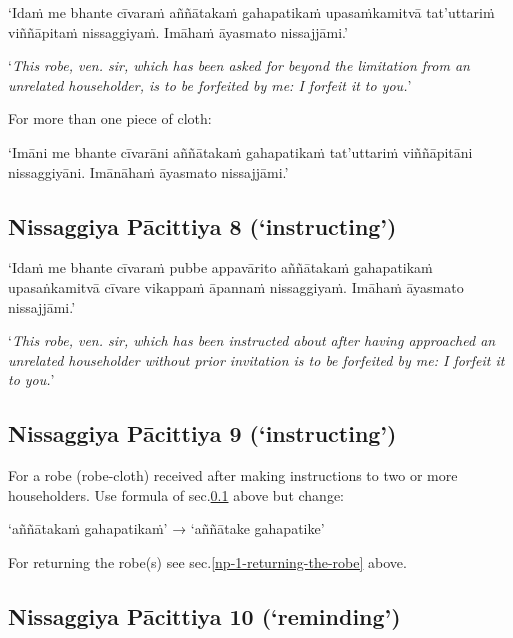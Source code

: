 ‘Idaṁ me bhante cīvaraṁ aññātakaṁ gahapatikaṁ upasaṁkamitvā tat'uttariṁ
viññāpitaṁ nissaggiyaṁ. Imāhaṁ āyasmato nissajjāmi.’

‘\emph{This robe, ven. sir, which has been asked for beyond the limitation from
  an unrelated householder, is to be forfeited by me: I forfeit it to you.}’

For more than one piece of cloth:

‘Imāni me bhante cīvarāni aññātakaṁ gahapatikaṁ tat'uttariṁ viññāpitāni
nissaggiyāni. Imānāhaṁ āyasmato nissajjāmi.’


\subsection[NP 8 (‘instructing’)]{Nissaggiya Pācittiya 8 (‘instructing’)}
\label{np-8-instructing}

‘Idaṁ me bhante cīvaraṁ pubbe appavārito aññātakaṁ gahapatikaṁ upasaṅkamitvā
cīvare vikappaṁ āpannaṁ nissaggiyaṁ. Imāhaṁ āyasmato nissajjāmi.’

‘\emph{This robe, ven. sir, which has been instructed about after having
  approached an unrelated householder without prior invitation is to be
  forfeited by me: I forfeit it to you.}’ 


\subsection[NP 9 (‘instructing’)]{Nissaggiya Pācittiya 9 (‘instructing’)}

For a robe (robe-cloth) received after making instructions to two or more
householders. Use formula of sec.\ref{np-8-instructing} above but change:

‘aññātakaṁ gahapatikaṁ’ → ‘aññātake gahapatike’

For returning the robe(s) see sec.\ref{np-1-returning-the-robe} above.


\subsection[NP 10 (‘reminding’)]{Nissaggiya Pācittiya 10 (‘reminding’)}

